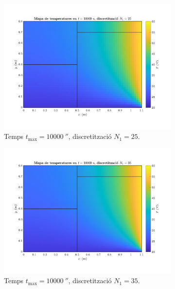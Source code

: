 \begin{figure}[ht]
	\begin{subfigure}{.5\textwidth}
		\centering
		\includegraphics[width=.95\linewidth]{imagenes/04_influencia/malla/malla_9.pdf}
		\vspace{-15pt}
		\caption{Temps $t_\text{max} = 10000 \ \second$, discretització $N_1 = 25$.}
		\label{fig:malla_9}
	\end{subfigure}%
	\begin{subfigure}{.5\textwidth}
		\centering
		\includegraphics[width=.95\linewidth]{imagenes/04_influencia/malla/malla_10.pdf}
		\vspace{-15pt}
		\caption{Temps $t_\text{max} = 10000 \ \second$, discretització $N_1 = 35$.}
		\label{fig:malla_10}
	\end{subfigure}
	\begin{subfigure}{.5\textwidth}

\end{subfigure}
\end{figure}
